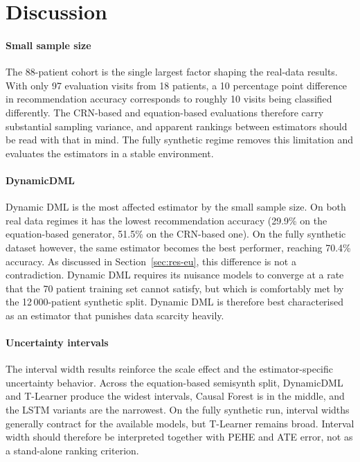\documentclass{article}
\begin{document}
\newpage
\section{Discussion}
\paragraph{Small sample size}
The 88-patient cohort is the single largest factor shaping the real-data results. With only 97 evaluation visits from 18 patients, a 10 percentage point difference in recommendation accuracy corresponds to roughly 10 visits being classified differently. The CRN-based and equation-based evaluations therefore carry substantial sampling variance, and apparent rankings between estimators should be read with that in mind. The fully synthetic regime removes this limitation and evaluates the estimators in a stable environment.

\paragraph{DynamicDML}
Dynamic DML is the most affected estimator by the small sample size. On
both real data regimes it has the lowest recommendation accuracy
(29.9\% on the equation-based generator, 51.5\% on the CRN-based one). On the fully
synthetic dataset however, the same estimator becomes the best
performer, reaching 70.4\% accuracy.
As discussed in
Section~\ref{sec:res-eu}, this difference is not a contradiction.
Dynamic DML requires its nuisance models to converge at a rate that the
70 patient training set cannot satisfy, but which is comfortably met
by the 12\,000-patient synthetic split. Dynamic DML is therefore best
characterised as an estimator that punishes data scarcity
heavily.

\paragraph{Uncertainty intervals}
The interval width results reinforce the scale effect and the estimator-specific
uncertainty behavior.
Across the equation-based semisynth split, DynamicDML and T-Learner
produce the widest intervals, Causal Forest is in the middle, and the LSTM
variants are the narrowest. On the fully synthetic run, interval widths
generally contract for the available models, but T-Learner remains broad.
Interval width should therefore be interpreted together with PEHE and ATE error,
not as a stand-alone ranking criterion.
\end{document}
